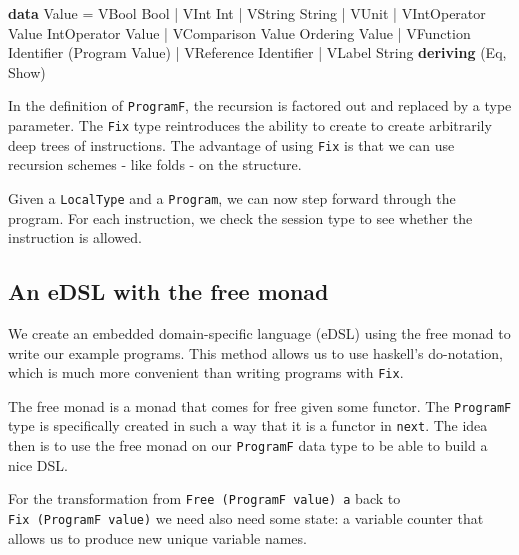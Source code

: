 \documentclass[runningheads]{llncs}
\newenvironment{Shaded}{}{}
\newcommand{\KeywordTok}[1]{\textcolor[rgb]{0.00,0.44,0.13}{\textbf{#1}}}
\newcommand{\DataTypeTok}[1]{\textcolor[rgb]{0.56,0.13,0.00}{#1}}
\newcommand{\FunctionTok}[1]{\textcolor[rgb]{0.02,0.16,0.49}{#1}}
\newcommand{\NormalTok}[1]{#1}
\begin{document}
\begin{Shaded}
\begin{Highlighting}[]
\KeywordTok{data} \DataTypeTok{Value} 
    \FunctionTok{=} \DataTypeTok{VBool} \DataTypeTok{Bool}
    \FunctionTok{|} \DataTypeTok{VInt} \DataTypeTok{Int}
    \FunctionTok{|} \DataTypeTok{VString} \DataTypeTok{String}
    \FunctionTok{|} \DataTypeTok{VUnit}
    \FunctionTok{|} \DataTypeTok{VIntOperator} \DataTypeTok{Value} \DataTypeTok{IntOperator} \DataTypeTok{Value} 
    \FunctionTok{|} \DataTypeTok{VComparison} \DataTypeTok{Value} \DataTypeTok{Ordering} \DataTypeTok{Value}
    \FunctionTok{|} \DataTypeTok{VFunction} \DataTypeTok{Identifier}\NormalTok{ (}\DataTypeTok{Program} \DataTypeTok{Value}\NormalTok{)}
    \FunctionTok{|} \DataTypeTok{VReference} \DataTypeTok{Identifier} 
    \FunctionTok{|} \DataTypeTok{VLabel} \DataTypeTok{String}
    \KeywordTok{deriving}\NormalTok{ (}\DataTypeTok{Eq}\NormalTok{, }\DataTypeTok{Show}\NormalTok{)}
\end{Highlighting}
\end{Shaded}

In the definition of \texttt{ProgramF}, the recursion is factored out
and replaced by a type parameter. The \texttt{Fix} type reintroduces the
ability to create to create arbitrarily deep trees of instructions. The
advantage of using \texttt{Fix} is that we can use recursion schemes -
like folds - on the structure.

Given a \texttt{LocalType} and a \texttt{Program}, we can now step
forward through the program. For each instruction, we check the session
type to see whether the instruction is allowed.

\subsection{An eDSL with the free
monad}\label{an-edsl-with-the-free-monad}

We create an embedded domain-specific language (eDSL) using the free
monad to write our example programs. This method allows us to use
haskell's do-notation, which is much more convenient than writing
programs with \texttt{Fix}.

The free monad is a monad that comes for free given some functor. The
\texttt{ProgramF} type is specifically created in such a way that it is
a functor in \texttt{next}. The idea then is to use the free monad on
our \texttt{ProgramF} data type to be able to build a nice DSL.

For the transformation from \texttt{Free\ (ProgramF\ value)\ a} back to
\texttt{Fix\ (ProgramF\ value)} we need also need some state: a variable
counter that allows us to produce new unique variable names.
\end{document}
